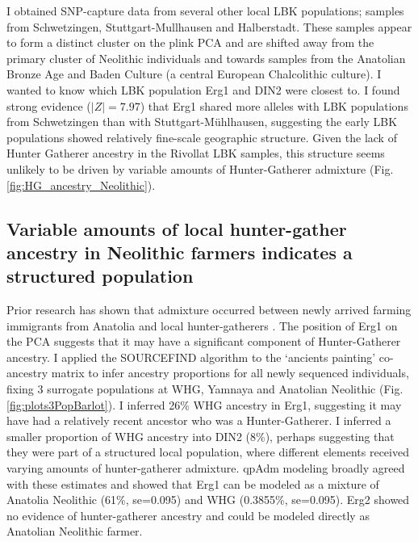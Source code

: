 I obtained SNP-capture data from several other local LBK populations; samples from Schwetzingen, Stuttgart-Mullhausen and Halberstadt. These samples appear to form a distinct cluster on the plink PCA and are shifted away from the primary cluster of Neolithic individuals and towards samples from the Anatolian Bronze Age and Baden Culture (a central European Chalcolithic culture). I wanted to know which LBK population Erg1 and DIN2 were closest to. I found strong evidence ($|Z| = 7.97$) that Erg1 shared more alleles with LBK populations from Schwetzingen than with Stuttgart-Mühlhausen, suggesting the early LBK populations showed relatively fine-scale geographic structure. Given the lack of Hunter Gatherer ancestry in the Rivollat LBK samples, this structure seems unlikely to be driven by variable amounts of Hunter-Gatherer admixture (Fig. \ref{fig:HG_ancestry_Neolithic}).


\subsection{Variable amounts of local hunter-gather ancestry in Neolithic farmers indicates a structured population}

Prior research has shown that admixture occurred between newly arrived farming immigrants from Anatolia and local hunter-gatherers \cite{Gamba2014, Lipson2017b}. The position of Erg1 on the PCA suggests that it may have a significant component of Hunter-Gatherer ancestry. I applied the SOURCEFIND algorithm to the `ancients painting' co-ancestry matrix to infer ancestry proportions for all newly sequenced individuals, fixing 3 surrogate populations at WHG, Yamnaya and Anatolian Neolithic (Fig. \ref{fig:plots3PopBarlot}). I inferred 26\% WHG ancestry in Erg1, suggesting it may have had a relatively recent ancestor who was a Hunter-Gatherer. I inferred a smaller proportion of WHG ancestry into DIN2 (8\%), perhaps suggesting that they were part of a structured local population, where different elements received varying amounts of hunter-gatherer admixture. qpAdm modeling broadly agreed with these estimates and showed that Erg1 can be modeled as a mixture of Anatolia Neolithic (61\%, se=0.095) and WHG (0.3855\%, se=0.095). Erg2 showed no evidence of hunter-gatherer ancestry and could be modeled directly as Anatolian Neolithic farmer.

